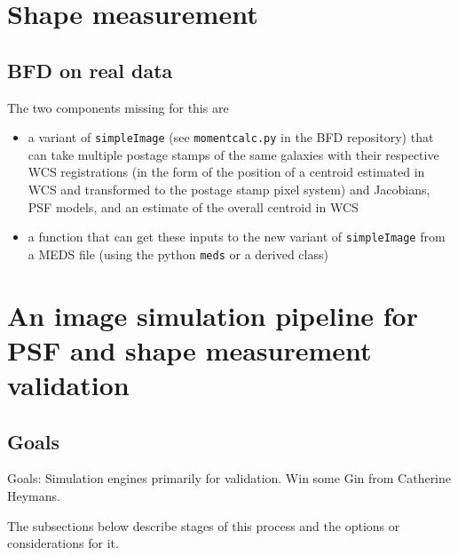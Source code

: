 \documentclass[\docopts]{\docclass}
\begin{document}

\section{Shape measurement}


\subsection{BFD on real data}


The two components missing for this are
\begin{itemize}
\item a variant of \texttt{simpleImage} (see \texttt{momentcalc.py} in the BFD repository) that can take multiple postage stamps of the same galaxies with their respective WCS registrations (in the form of the position of a centroid estimated in WCS and transformed to the postage stamp pixel system) and Jacobians, PSF models, and an estimate of the overall centroid in WCS 
\item a function that can get these inputs to the new variant of \texttt{simpleImage} from a MEDS file (using the python \texttt{meds} or a derived class) 
\end{itemize}



\section{An image simulation pipeline for PSF and shape measurement validation}


\subsection{Goals}
Goals: Simulation engines primarily for validation. Win some Gin from Catherine Heymans.

The subsections below describe stages of this process and the options or considerations for it.
\end{document}
